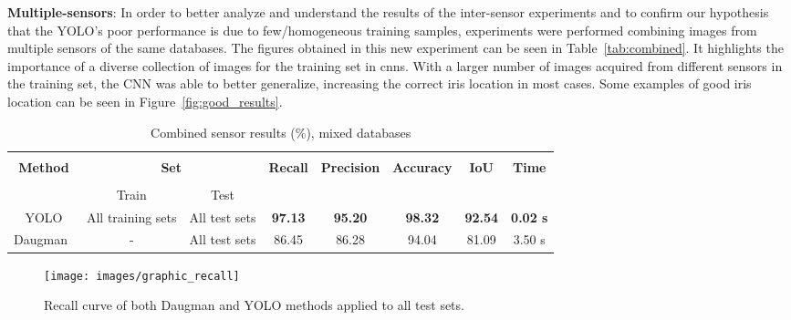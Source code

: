 \documentclass[conference]{IEEEtran}
\begin{document}
\textbf{Multiple-sensors}: 
In order to better analyze and understand the results of the inter-sensor experiments and to confirm our hypothesis that the YOLO's poor performance is due to few/homogeneous training samples, experiments were performed combining images from multiple sensors of the same databases. 
The figures obtained in this new experiment can be seen in Table~\ref{tab:combined}.
It highlights the importance of a diverse collection of images for the training set in \glspl*{cnn}. 
With a larger number of images acquired from different sensors in the training set, the CNN was able to better generalize, increasing the correct iris location in most cases. 
Some examples of good iris location can be seen in Figure~\ref{fig:good_results}.


\begin{table*}[!ht]
	\centering
	\caption{Combined sensor results (\%), mixed databases}
	\label{tab:all}
	\begin{tabular}{ c c c c c c c c}\hline  \\[\dimexpr-\normalbaselineskip+4pt]

		 \multirow{2}{*}{\textbf{Method}} & \multicolumn{2}{c}{\textbf{Set}} & \multirow{2}{*}{\textbf{Recall}} & \multirow{2}{*}{\textbf{Precision}} & \multirow{2}{*}{\textbf{Accuracy}} & \multirow{2}{*}{\textbf{IoU}} & \multirow{2}{*}{\textbf{Time}} \\
		 \\[\dimexpr-\normalbaselineskip+2pt] 
		 
		          & Train & Test    &  &  &  & &  \\ \toprule

		YOLO     & All training sets & All test sets    & \textbf{97.13}  & \textbf{95.20} & \textbf{98.32} & \textbf{92.54} &  \textbf{0.02 s}  \\ 
		                   
		Daugman~\cite{daugman2004iris} & - & All test sets   & 86.45  & 86.28 & 94.04 & 81.09 & 3.50 s   \\ \bottomrule
		                   		
	\end{tabular}
\end{table*}

\begin{figure}[!htb]
\centering
\texttt{[image: images/graphic\_recall]}
\caption{Recall curve of both Daugman and YOLO methods applied to all test sets.}
\label{fig:graphic_recall}
\end{figure}
\end{document}
